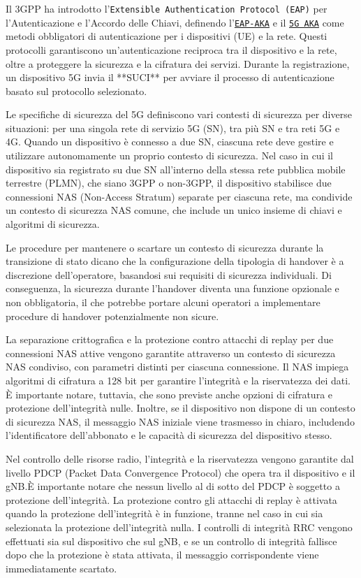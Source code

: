 \documentclass[english]{article}
\begin{document}
Il 3GPP ha introdotto l'\texttt{Extensible Authentication Protocol (EAP)} per
l'Autenticazione e l'Accordo delle Chiavi, definendo
l'\texttt{\hyperlink{EAP-AKA}{EAP-AKA}} e il \texttt{\hyperlink{5G AKA}{5G AKA}} 
come metodi obbligatori di autenticazione per i dispositivi (UE) e la
rete. Questi protocolli garantiscono un'autenticazione reciproca tra il
dispositivo e la rete, oltre a proteggere la sicurezza e la cifratura dei
servizi. Durante la registrazione, un dispositivo 5G invia il **SUCI** per
avviare il processo di autenticazione basato sul protocollo selezionato.

Le specifiche di sicurezza del 5G definiscono vari contesti di sicurezza per
diverse situazioni: per una singola rete di servizio 5G (SN), tra più SN e tra
reti 5G e 4G. Quando un dispositivo è connesso a due SN, ciascuna rete deve
gestire e utilizzare autonomamente un proprio contesto di sicurezza. Nel caso
in cui il dispositivo sia registrato su due SN all'interno della stessa rete
pubblica mobile terrestre (PLMN), che siano 3GPP o non-3GPP, il dispositivo
stabilisce due connessioni NAS (Non-Access Stratum) separate per ciascuna rete,
ma condivide un contesto di sicurezza NAS comune, che include un unico insieme
di chiavi e algoritmi di sicurezza.

Le procedure per mantenere o scartare un contesto di sicurezza durante la
transizione di stato dicano che la configurazione della tipologia di handover è
a discrezione dell'operatore, basandosi sui requisiti di sicurezza individuali.
Di conseguenza, la sicurezza durante l'handover diventa una funzione opzionale
e non obbligatoria, il che potrebbe portare alcuni operatori a implementare
procedure di handover potenzialmente non sicure.

La separazione crittografica e la protezione contro attacchi di replay per due
connessioni NAS attive vengono garantite attraverso un contesto di sicurezza
NAS condiviso, con parametri distinti per ciascuna connessione. Il NAS impiega
algoritmi di cifratura a 128 bit per garantire l'integrità e la riservatezza
dei dati. È importante notare, tuttavia, che sono previste anche opzioni di
cifratura e protezione dell'integrità nulle. Inoltre, se il dispositivo non
dispone di un contesto di sicurezza NAS, il messaggio NAS iniziale viene
trasmesso in chiaro, includendo l'identificatore dell'abbonato e le capacità di
sicurezza del dispositivo stesso.

Nel controllo delle risorse radio, l'integrità e la riservatezza vengono
garantite dal livello PDCP (Packet Data Convergence Protocol) che opera tra il
dispositivo e il gNB.\@ È importante notare che nessun livello al di sotto del
PDCP è soggetto a protezione dell'integrità. La protezione contro gli attacchi
di replay è attivata quando la protezione dell'integrità è in funzione, tranne
nel caso in cui sia selezionata la protezione dell'integrità nulla. I controlli
di integrità RRC vengono effettuati sia sul dispositivo che sul gNB, e se un
controllo di integrità fallisce dopo che la protezione è stata attivata, il
messaggio corrispondente viene immediatamente scartato.
\end{document}
